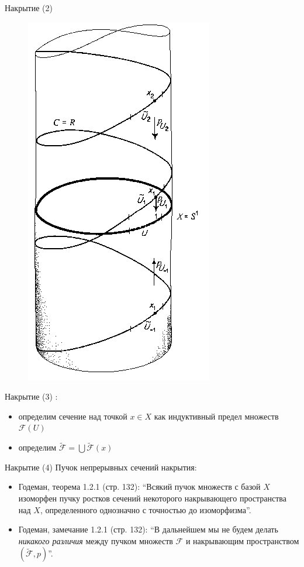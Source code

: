 \documentclass{beamer}
\begin{document}
\begin{frame}{Накрытие (2)}
\begin{center}
	\begin{figure}[H]
		\includegraphics[scale=0.3]{covering1.png} 
	\end{figure}
\end{center}
\end{frame}

\begin{frame}{Накрытие (3)}
:\\
\medskip
\begin{itemize}
	\item определим сечение над точкой $x \in X$ как индуктивный предел множеств $\mathcal{F}(U)$
	\item определим $\widetilde{\mathcal{F}} = \bigcup \widetilde{\mathcal{F}}(x)$
\end{itemize}
\end{frame}

\begin{frame}{Накрытие (4)}
Пучок непрерывных сечений накрытия:\\
\medskip
\begin{itemize}
    \item Годеман, теорема 1.2.1 (стр. 132): ``Всякий пучок множеств с базой $X$ изоморфен пучку ростков сечений некоторого накрывающего пространства над $X$, определенного однозначно с точностью до изоморфизма''.
    \smallskip
	\item Годеман, замечание 1.2.1 (стр. 132): ``В дальнейшем мы не будем делать \textit{никакого различия} между пучком множеств $\mathcal{F}$ и накрывающим пространством $(\widetilde{\mathcal{F}}, p)$''.
\end{itemize}
\end{frame}
\end{document}

